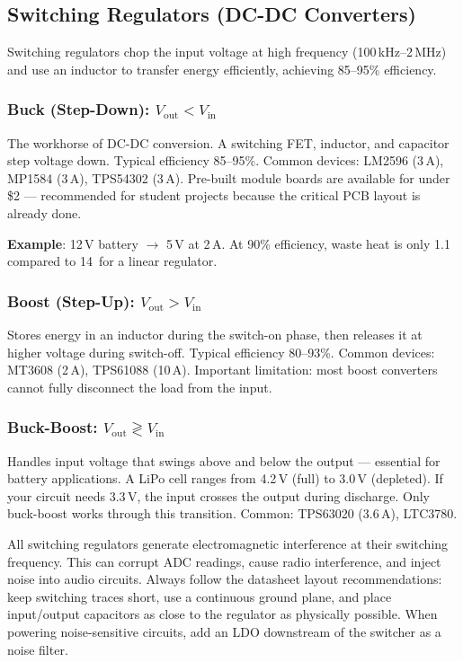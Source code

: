 \documentclass[11pt,letterpaper,twoside,openany]{book}
\begin{document}
\subsection{Switching Regulators (DC-DC Converters)}

Switching regulators chop the input voltage at high frequency (100\,kHz--2\,MHz) and use an inductor to transfer energy efficiently, achieving 85--95\% efficiency.

\subsubsection{Buck (Step-Down): $V_{\text{out}} < V_{\text{in}}$}

The workhorse of DC-DC conversion. A switching FET, inductor, and capacitor step voltage down. Typical efficiency 85--95\%. Common devices: LM2596 (3\,A), MP1584 (3\,A), TPS54302 (3\,A). Pre-built module boards are available for under \$2 --- recommended for student projects because the critical PCB layout is already done.

\textbf{Example}: 12\,V battery $\to$ 5\,V at 2\,A. At 90\% efficiency, waste heat is only 1.1\, compared to 14\, for a linear regulator.

\subsubsection{Boost (Step-Up): $V_{\text{out}} > V_{\text{in}}$}

Stores energy in an inductor during the switch-on phase, then releases it at higher voltage during switch-off. Typical efficiency 80--93\%. Common devices: MT3608 (2\,A), TPS61088 (10\,A). Important limitation: most boost converters cannot fully disconnect the load from the input.

\subsubsection{Buck-Boost: $V_{\text{out}} \gtrless V_{\text{in}}$}

Handles input voltage that swings above and below the output --- essential for battery applications. A LiPo cell ranges from 4.2\,V (full) to 3.0\,V (depleted). If your circuit needs 3.3\,V, the input crosses the output during discharge. Only buck-boost works through this transition. Common: TPS63020 (3.6\,A), LTC3780.

\begin{warningbox}
All switching regulators generate electromagnetic interference at their switching frequency. This can corrupt ADC readings, cause radio interference, and inject noise into audio circuits. Always follow the datasheet layout recommendations: keep switching traces short, use a continuous ground plane, and place input/output capacitors as close to the regulator as physically possible. When powering noise-sensitive circuits, add an LDO downstream of the switcher as a noise filter.
\end{warningbox}
\end{document}
